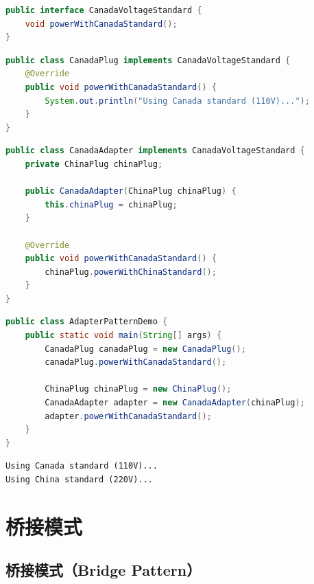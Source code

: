 \begin{lstlisting}[language=Java, title=CanadaVoltageStandard.java]
public interface CanadaVoltageStandard {
    void powerWithCanadaStandard();
}
\end{lstlisting}

\begin{lstlisting}[language=Java, title=CanadaPlug.java]
public class CanadaPlug implements CanadaVoltageStandard {
    @Override
    public void powerWithCanadaStandard() {
        System.out.println("Using Canada standard (110V)...");
    }
}
\end{lstlisting}

\begin{lstlisting}[language=Java, title=CanadaAdapter.java]
public class CanadaAdapter implements CanadaVoltageStandard {
    private ChinaPlug chinaPlug;

    public CanadaAdapter(ChinaPlug chinaPlug) {
        this.chinaPlug = chinaPlug;
    }

    @Override
    public void powerWithCanadaStandard() {
        chinaPlug.powerWithChinaStandard();
    }
}
\end{lstlisting}

\begin{lstlisting}[language=Java, title=AdapterPatternDemo.java]
public class AdapterPatternDemo {
    public static void main(String[] args) {
        CanadaPlug canadaPlug = new CanadaPlug();
        canadaPlug.powerWithCanadaStandard();

        ChinaPlug chinaPlug = new ChinaPlug();
        CanadaAdapter adapter = new CanadaAdapter(chinaPlug);
        adapter.powerWithCanadaStandard();
    }
}
\end{lstlisting}

\begin{tcolorbox}
    \begin{verbatim}
Using Canada standard (110V)...
Using China standard (220V)...
\end{verbatim}
\end{tcolorbox}

\newpage

\section{桥接模式}

\subsection{桥接模式（Bridge Pattern）}

